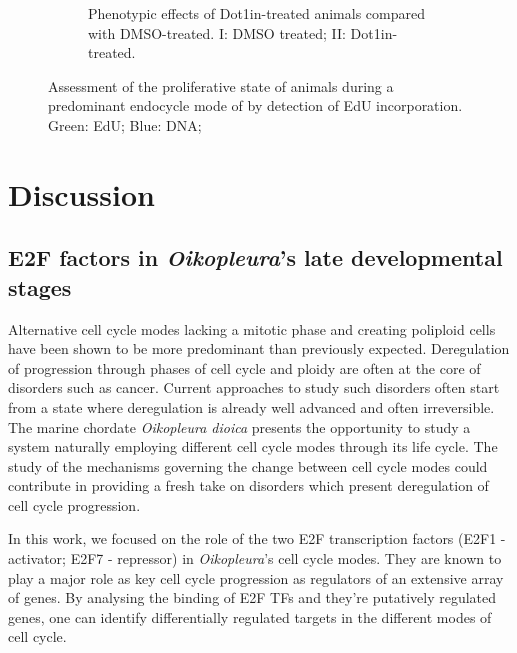 \documentclass[11pt,twoside,a4paper]{report}
\begin{document}
\begin{figure}[h!]
\begin{subfigure}{0.8\textwidth}
			\caption{
				Phenotypic effects of Dot1in-treated animals compared with DMSO-treated.
				{\footnotesize
					I: DMSO treated;
					II: Dot1in-treated.
				}
			}
		\end{subfigure}
		\caption{Assessment of the proliferative state of animals during a predominant endocycle mode of by detection of EdU incorporation.
		Green: EdU;
		Blue: DNA;
		}
		\label{fig:Dot1in_D5}
	\end{figure}

\cleardoublepage

\chapter{Discussion}

\section{E2F factors in \textit{Oikopleura}'s late developmental stages}
Alternative cell cycle modes lacking a mitotic phase and creating poliploid cells have been shown to be more predominant than previously expected. Deregulation of progression through phases of cell cycle and ploidy are often at the core of disorders such as cancer. Current approaches to study such disorders often start from a state where deregulation is already well advanced and often irreversible. The marine chordate \textit{Oikopleura dioica} presents the opportunity to study a system naturally employing different cell cycle modes through its life cycle. The study of the mechanisms governing the change between cell cycle modes could contribute in providing a fresh take on disorders which present deregulation of cell cycle progression.

In this work, we focused on the role of the two E2F transcription factors (E2F1 - activator; E2F7 - repressor) in \textit{Oikopleura}'s cell cycle modes. They are known to play a major role as key cell cycle progression as regulators of an extensive array of genes. By analysing the binding of E2F TFs and they're putatively regulated genes, one can identify differentially regulated targets in the different modes of cell cycle.
\end{document}
